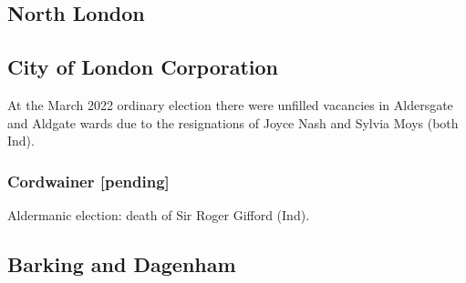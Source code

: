 \documentclass[a4paper,openany]{book}
\begin{document}
\begin{resultsiii}

%
%
%
%
%

\section{North London}

\subsection*{City of London Corporation}

At the March 2022 ordinary election there were unfilled vacancies in Aldersgate and Aldgate wards due to the resignations of Joyce Nash and Sylvia Moys (both Ind).

\subsubsection*{Cordwainer \hspace*{\fill}\nolinebreak[1]%
	\enspace\hspace*{\fill}
	[pending]}


Aldermanic election: death of Sir Roger Gifford (Ind).

\subsection*{Barking and Dagenham}


\end{resultsiii}
\end{document}
